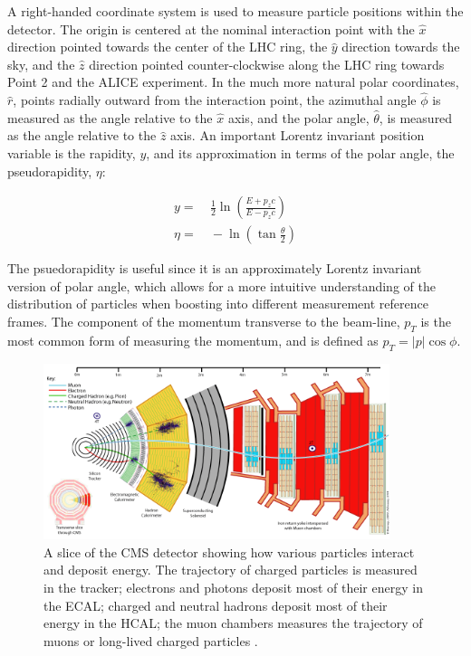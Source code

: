 \par A right-handed coordinate system is used to measure particle
positions within the detector.  The origin is centered at the nominal
interaction point with the $\hat{x}$ direction pointed towards the
center of the LHC ring, the $\hat{y}$ direction towards the sky, and
the $\hat{z}$ direction pointed counter-clockwise along the LHC ring
towards Point 2 and the ALICE experiment.  In the much more natural
polar coordinates, $\hat{r}$, points radially outward from the
interaction point, the azimuthal angle $\hat{\phi}$ is measured as the
angle relative to the $\hat{x}$ axis, and the polar angle,
$\hat{\theta}$, is measured as the angle relative to the $\hat{z}$
axis.  An important Lorentz invariant position variable is the
rapidity, $y$, and its approximation in terms of the polar angle, the
pseudorapidity, $\eta$:

\begin{equation}
\begin{aligned}
y =&~ \frac{1}{2}\ln\left({\frac{E+p_{z}c}{E-p_{z}c}}\right) \\
\eta =&~ -\ln\left(\tan{\frac{\theta}{2}}\right)
\end{aligned}
\end{equation}

\noindent The psuedorapidity is useful since it is an approximately Lorentz
invariant version of polar angle, which allows for a more intuitive
understanding of the distribution of particles when boosting into
different measurement reference frames.  The component of the momentum
transverse to the beam-line, $p_{T}$ is the most common form of
measuring the momentum, and is defined as $p_{T} = |p|\cos{\phi}$.  

\begin{figure}[h]
   \centering
  \includegraphics[width=0.9\textwidth]{Figures/CMS_Diagrams/CMS__Slice.png}
  \caption{A slice of the CMS detector showing how various particles
    interact and deposit energy.  The trajectory of charged particles
    is measured in the tracker; electrons and photons deposit most of
    their energy in the ECAL; charged and neutral hadrons deposit most
  of their energy in the HCAL; the muon chambers measures the
  trajectory of muons or long-lived charged particles
  \cite{CMS:CMS_slice}.} \label{fig:cms_slice}
\end{figure}

